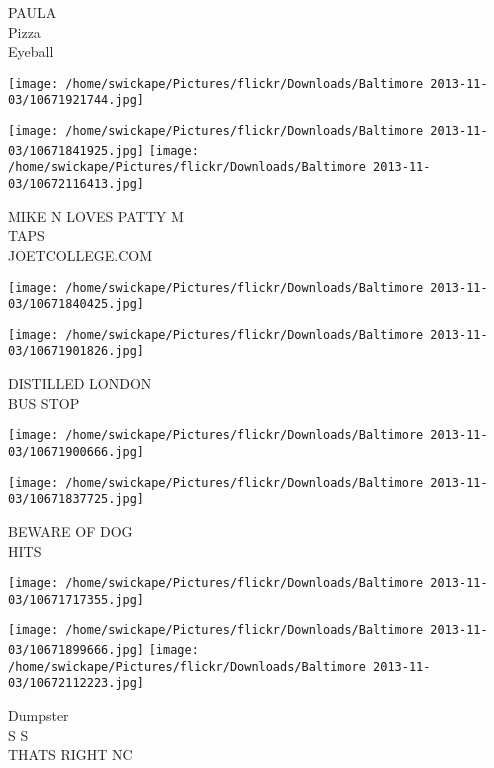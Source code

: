 \documentclass[10pt,letterpaper]{article}
\begin{document}
PAULA\\
Pizza\\
Eyeball\\
\pagebreak

\texttt{[image: /home/swickape/Pictures/flickr/Downloads/Baltimore 2013-11-03/10671921744.jpg]}

\vspace{0.25in}
\texttt{[image: /home/swickape/Pictures/flickr/Downloads/Baltimore 2013-11-03/10671841925.jpg]}
\texttt{[image: /home/swickape/Pictures/flickr/Downloads/Baltimore 2013-11-03/10672116413.jpg]}

MIKE N LOVES PATTY M\\
TAPS\\
JOETCOLLEGE.COM\\
\pagebreak

\texttt{[image: /home/swickape/Pictures/flickr/Downloads/Baltimore 2013-11-03/10671840425.jpg]}

\vspace{0.25in}
\texttt{[image: /home/swickape/Pictures/flickr/Downloads/Baltimore 2013-11-03/10671901826.jpg]}

DISTILLED LONDON\\
BUS STOP\\
\pagebreak

\texttt{[image: /home/swickape/Pictures/flickr/Downloads/Baltimore 2013-11-03/10671900666.jpg]}

\vspace{0.25in}
\texttt{[image: /home/swickape/Pictures/flickr/Downloads/Baltimore 2013-11-03/10671837725.jpg]}

BEWARE OF DOG\\
HITS\\
\pagebreak

\texttt{[image: /home/swickape/Pictures/flickr/Downloads/Baltimore 2013-11-03/10671717355.jpg]}

\vspace{0.25in}
\texttt{[image: /home/swickape/Pictures/flickr/Downloads/Baltimore 2013-11-03/10671899666.jpg]}
\texttt{[image: /home/swickape/Pictures/flickr/Downloads/Baltimore 2013-11-03/10672112223.jpg]}

Dumpster\\
S S\\
THATS RIGHT NC\\
\pagebreak
\end{document}
